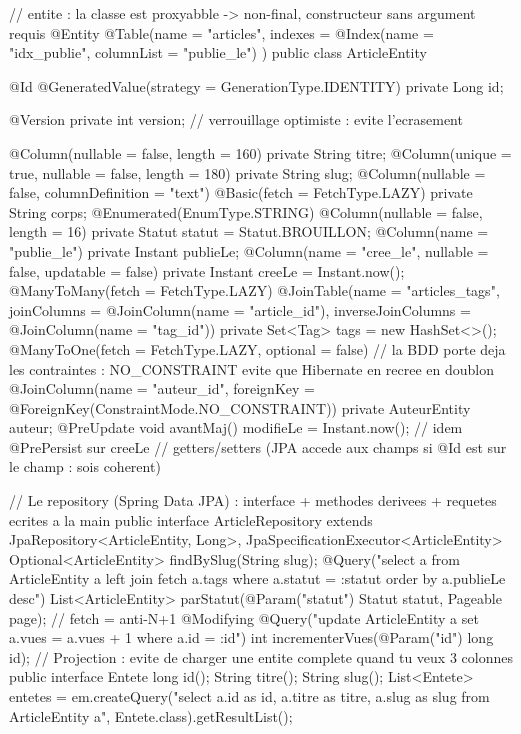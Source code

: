 \documentclass[12pt,a4paper,twoside,openright]{book}
\begin{document}
\begin{codejava}
// entite : la classe est proxyabble -> non-final, constructeur sans argument requis
@Entity
@Table(name = "articles", indexes = { @Index(name = "idx_publie", columnList = "publie_le") })
public class ArticleEntity {
    @Id @GeneratedValue(strategy = GenerationType.IDENTITY)
    private Long id;

    @Version private int version;                    // verrouillage optimiste : evite l'ecrasement

    @Column(nullable = false, length = 160) private String titre;
    @Column(unique = true, nullable = false, length = 180) private String slug;
    @Column(nullable = false, columnDefinition = "text") @Basic(fetch = FetchType.LAZY) private String corps;
    @Enumerated(EnumType.STRING) @Column(nullable = false, length = 16) private Statut statut = Statut.BROUILLON;
    @Column(name = "publie_le") private Instant publieLe;
    @Column(name = "cree_le", nullable = false, updatable = false) private Instant creeLe = Instant.now();
    @ManyToMany(fetch = FetchType.LAZY)
    @JoinTable(name = "articles_tags",
               joinColumns = @JoinColumn(name = "article_id"), inverseJoinColumns = @JoinColumn(name = "tag_id"))
    private Set<Tag> tags = new HashSet<>();
    @ManyToOne(fetch = FetchType.LAZY, optional = false)
    // la BDD porte deja les contraintes : NO_CONSTRAINT evite que Hibernate en recree en doublon
    @JoinColumn(name = "auteur_id", foreignKey = @ForeignKey(ConstraintMode.NO_CONSTRAINT))
    private AuteurEntity auteur;
    @PreUpdate void avantMaj() { modifieLe = Instant.now(); }     // idem @PrePersist sur creeLe
    // getters/setters (JPA accede aux champs si @Id est sur le champ : sois coherent)
}

// Le repository (Spring Data JPA) : interface + methodes derivees + requetes ecrites a la main
public interface ArticleRepository extends JpaRepository<ArticleEntity, Long>, JpaSpecificationExecutor<ArticleEntity> {
    Optional<ArticleEntity> findBySlug(String slug);
    @Query("select a from ArticleEntity a left join fetch a.tags where a.statut = :statut order by a.publieLe desc")
    List<ArticleEntity> parStatut(@Param("statut") Statut statut, Pageable page);   // fetch = anti-N+1
    @Modifying @Query("update ArticleEntity a set a.vues = a.vues + 1 where a.id = :id")
    int incrementerVues(@Param("id") long id);
}
// Projection : evite de charger une entite complete quand tu veux 3 colonnes
public interface Entete { long id(); String titre(); String slug(); }
List<Entete> entetes = em.createQuery("select a.id as id, a.titre as titre, a.slug as slug from ArticleEntity a", Entete.class).getResultList();


\end{codejava}
\end{document}
